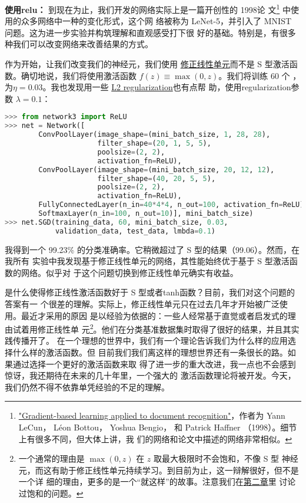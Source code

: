 \textbf{使用\gls*{relu}：} 到现在为止，我们开发的网络实际上是一篇开创性的 1998论
文\footnote{\href{http://yann.lecun.com/exdb/publis/pdf/lecun-98.pdf}{"Gradient-based
    learning applied to document recognition"}，作者为 Yann LeCun， Léon Bottou，
  Yoshua Bengio， 和 Patrick Haffner （1998）。细节上有很多不同，但大体上讲，我
  们的网络和论文中描述的网络非常相似。} 中使用的众多网络中一种的变化形式，这个网
络被称为 LeNet-5，并引入了 MNIST 问题。这为进一步实验并构筑理解和直观感受打下很
好的基础。特别是，有很多种我们可以改变网络来改善结果的方式。

作为开始，让我们改变我们的神经元，我们使用%
\hyperref[sec:other_models_of_artificial_neuron]{修正线性单元}而不是 S 型激活函
数。确切地说，我们将使用激活函数 $f(z) \equiv \max(0, z)$。我们将训练 $60$ 个%
\epochs{}，\learningrate{}为$\eta = 0.03$。我也发现用一些
\hyperref[sec:overfitting_and_regularization]{L2 \gls*{regularization}}也有点帮
助，使用\gls*{regularization}参数 $\lambda = 0.1$：
\begin{lstlisting}[language=Python]
>>> from network3 import ReLU
>>> net = Network([
        ConvPoolLayer(image_shape=(mini_batch_size, 1, 28, 28), 
                      filter_shape=(20, 1, 5, 5), 
                      poolsize=(2, 2), 
                      activation_fn=ReLU),
        ConvPoolLayer(image_shape=(mini_batch_size, 20, 12, 12), 
                      filter_shape=(40, 20, 5, 5), 
                      poolsize=(2, 2), 
                      activation_fn=ReLU),
        FullyConnectedLayer(n_in=40*4*4, n_out=100, activation_fn=ReLU),
        SoftmaxLayer(n_in=100, n_out=10)], mini_batch_size)
>>> net.SGD(training_data, 60, mini_batch_size, 0.03, 
            validation_data, test_data, lmbda=0.1)
\end{lstlisting}

我得到一个 99.23\% 的分类准确率。它稍微超过了 S 型的结果（99.06）。然而，在我所有
实验中我发现基于修正线性单元的网络，其性能始终优于基于 S 型激活函数的网络。似乎对
于这个问题切换到修正线性单元确实有收益。

是什么使得修正线性激活函数好于 S 型或者\gls*{tanh}函数？目前，我们对这个问题的答案有一
个很差的理解。实际上，修正线性单元只在过去几年才开始被广泛使用。最近才采用的原因
是以经验为依据的：一些人经常基于直觉或者启发式的理由试着用修正线性单
元\footnote{一个通常的理由是 $\max(0, z)$ 在 $z$ 取最大极限时不会饱和，不像 S 型
  神经元，而这有助于修正线性单元持续学习。到目前为止，这一辩解很好，但不是一个详
  细的理由，更多的是一个“就这样”的故事。注意我们在\hyperref[saturation]{第二章}里
  讨论过饱和的问题。}。他们在分类基准数据集时取得了很好的结果，并且其实践传播开了。
在一个理想的世界中，我们有一个理论告诉我们为什么样的应用选择什么样的激活函数。但
目前我们我们离这样的理想世界还有一条很长的路。如果通过选择一个更好的激活函数来取
得了进一步的重大改进，我一点也不会感到惊讶，我还期待在未来的几十年里，一个强大的
激活函数理论将被开发。今天，
我们仍然不得不依靠单凭经验的不足的理解。\\

